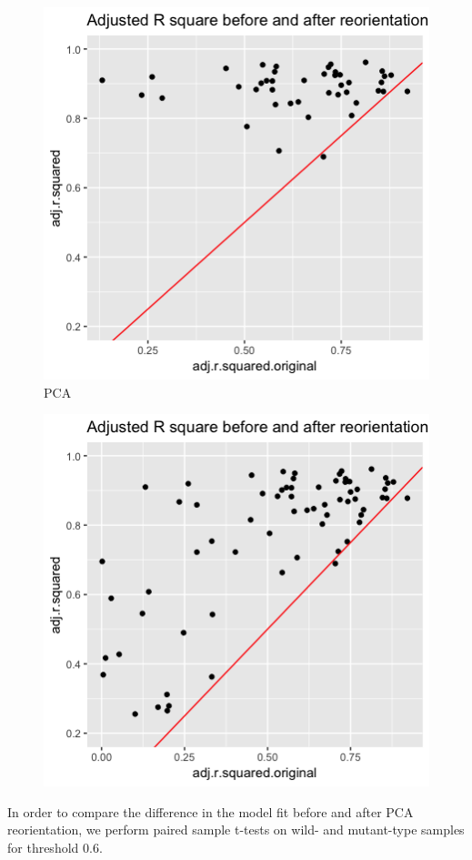 \documentclass[10pt,letterpaper]{article}
\begin{document}
\begin{figure}[H]
\includegraphics[width=0.8\linewidth]{visualization_paper/adj_r2_before_after_wt} \caption{PCA }\label{fig:Figure14}
\end{figure}

\begin{figure}[H]
\includegraphics[width=0.8\linewidth]{visualization_paper/adj_r2_before_after_yt} \end{figure}

In order to compare the difference in the model fit before and after PCA
reorientation, we perform paired sample t-tests on wild- and mutant-type
samples for threshold 0.6.
\end{document}
